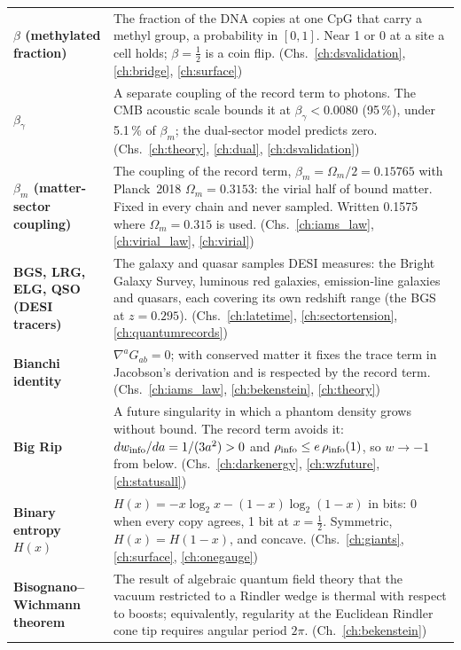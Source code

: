 {\begin{longtable}{@{}>{\raggedright\arraybackslash}p{}>{\raggedright\arraybackslash}p{}@{}}
\textbf{$\beta$ (methylated fraction)} & The fraction of the DNA copies at one CpG that carry a methyl group, a probability in $[0,1]$. Near 1 or 0 at a site a cell holds; $\beta=\tfrac12$ is a coin flip. {\footnotesize(Chs.~\ref{ch:dsvalidation}, \ref{ch:bridge}, \ref{ch:surface})}\\[1pt]
\textbf{$\beta_\gamma$} & A separate coupling of the record term to photons. The CMB acoustic scale bounds it at $\beta_\gamma<0.0080$ (95\,\%), under 5.1\,\% of $\beta_m$; the dual-sector model predicts zero. {\footnotesize(Chs.~\ref{ch:theory}, \ref{ch:dual}, \ref{ch:dsvalidation})}\\[1pt]
\textbf{$\beta_m$ (matter-sector coupling)} & The coupling of the record term, $\beta_m=\Omega_m/2=0.15765$ with Planck~2018 $\Omega_m=0.3153$: the virial half of bound matter. Fixed in every chain and never sampled. Written 0.1575 where $\Omega_m=0.315$ is used. {\footnotesize(Chs.~\ref{ch:iams_law}, \ref{ch:virial_law}, \ref{ch:virial})}\\[1pt]
\textbf{BGS, LRG, ELG, QSO (DESI tracers)} & The galaxy and quasar samples DESI measures: the Bright Galaxy Survey, luminous red galaxies, emission-line galaxies and quasars, each covering its own redshift range (the BGS at $z=0.295$). {\footnotesize(Chs.~\ref{ch:latetime}, \ref{ch:sectortension}, \ref{ch:quantumrecords})}\\[1pt]
\textbf{Bianchi identity} & $\nabla^aG_{ab}=0$; with conserved matter it fixes the trace term in Jacobson's derivation and is respected by the record term. {\footnotesize(Chs.~\ref{ch:iams_law}, \ref{ch:bekenstein}, \ref{ch:theory})}\\[1pt]
\textbf{Big Rip} & A future singularity in which a phantom density grows without bound. The record term avoids it: $dw_{\rm info}/da=1/(3a^2)>0$ and $\rho_{\rm info}\le e\,\rho_{\rm info}(1)$, so $w\to-1$ from below. {\footnotesize(Chs.~\ref{ch:darkenergy}, \ref{ch:wzfuture}, \ref{ch:statusall})}\\[1pt]
\textbf{Binary entropy $H(x)$} & $H(x)=-x\log_2x-(1-x)\log_2(1-x)$ in bits: 0 when every copy agrees, 1 bit at $x=\tfrac12$. Symmetric, $H(x)=H(1-x)$, and concave. {\footnotesize(Chs.~\ref{ch:giants}, \ref{ch:surface}, \ref{ch:onegauge})}\\[1pt]
\textbf{Bisognano--Wichmann theorem} & The result of algebraic quantum field theory that the vacuum restricted to a Rindler wedge is thermal with respect to boosts; equivalently, regularity at the Euclidean Rindler cone tip requires angular period $2\pi$. {\footnotesize(Ch.~\ref{ch:bekenstein})}\\[1pt]

\end{longtable}}

